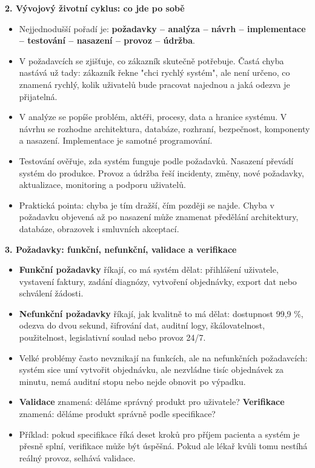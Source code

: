\textbf{2. Vývojový životní cyklus: co jde po sobě}
\begin{itemize}
  \item Nejjednodušší pořadí je: \textbf{požadavky -- analýza -- návrh -- implementace -- testování -- nasazení -- provoz -- údržba}.
  \item V požadavcích se zjišťuje, co zákazník skutečně potřebuje. Častá chyba nastává už tady: zákazník řekne "chci rychlý systém", ale není určeno, co znamená rychlý, kolik uživatelů bude pracovat najednou a jaká odezva je přijatelná.
  \item V analýze se popíše problém, aktéři, procesy, data a hranice systému. V návrhu se rozhodne architektura, databáze, rozhraní, bezpečnost, komponenty a nasazení. Implementace je samotné programování.
  \item Testování ověřuje, zda systém funguje podle požadavků. Nasazení převádí systém do produkce. Provoz a údržba řeší incidenty, změny, nové požadavky, aktualizace, monitoring a podporu uživatelů.
  \item Praktická pointa: chyba je tím dražší, čím později se najde. Chyba v požadavku objevená až po nasazení může znamenat předělání architektury, databáze, obrazovek i smluvních akceptací.
\end{itemize}

\textbf{3. Požadavky: funkční, nefunkční, validace a verifikace}
\begin{itemize}
  \item \textbf{Funkční požadavky} říkají, co má systém dělat: přihlášení uživatele, vystavení faktury, zadání diagnózy, vytvoření objednávky, export dat nebo schválení žádosti.
  \item \textbf{Nefunkční požadavky} říkají, jak kvalitně to má dělat: dostupnost 99,9 \%, odezva do dvou sekund, šifrování dat, auditní logy, škálovatelnost, použitelnost, legislativní soulad nebo provoz 24/7.
  \item Velké problémy často nevznikají na funkcích, ale na nefunkčních požadavcích: systém sice umí vytvořit objednávku, ale nezvládne tisíc objednávek za minutu, nemá auditní stopu nebo nejde obnovit po výpadku.
  \item \textbf{Validace} znamená: děláme správný produkt pro uživatele? \textbf{Verifikace} znamená: děláme produkt správně podle specifikace?
  \item Příklad: pokud specifikace říká deset kroků pro příjem pacienta a systém je přesně splní, verifikace může být úspěšná. Pokud ale lékař kvůli tomu nestíhá reálný provoz, selhává validace.
\end{itemize}

